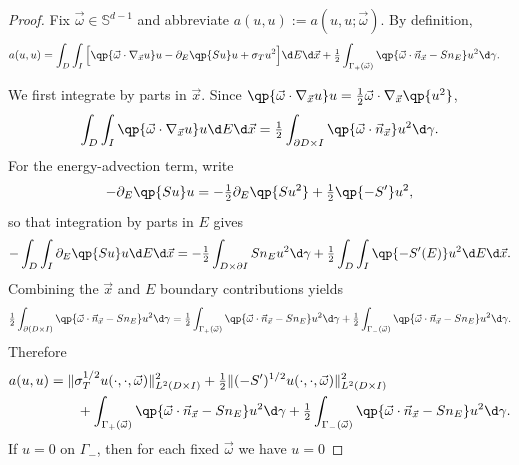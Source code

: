 \documentclass[final]{amsart}
\begin{document}
\begin{proof}
Fix $\vec{\omega}\in\mathbb{S}^{d-1}$ and abbreviate
$a(u,u):=a(u,u;\vec{\omega})$. By definition,
\begin{align*}
  a(u,u)
  &=
  \int_D \int_I
  \Big[\qp{\vec{\omega}\cdot\nabla_{\vec x} u} u
  - \partial_E\qp{S u} u
  + \sigma_T u^2\Big]\d E \d\vec{x}
  + \tfrac{1}{2}\int_{\Gamma_+(\vec\omega)}\qp{\vec{\omega}\cdot\vec{n}_{\vec x} - S n_E} u^2 \d\gamma.
\end{align*}

We first integrate by parts in $\vec{x}$. Since
$\qp{\vec{\omega}\cdot\nabla_{\vec x} u} u = \tfrac{1}{2}\vec{\omega}\cdot\nabla_{\vec x}\qp{u^2}$,
\begin{equation*}
  \int_D \int_I \qp{\vec{\omega}\cdot\nabla_{\vec x} u} u \d E \d\vec{x}
  =
  \tfrac{1}{2}\int_{\partial D\times I}\qp{\vec{\omega}\cdot\vec{n}_{\vec x}} u^2 \d\gamma.
\end{equation*}
For the energy-advection term, write
\begin{equation*}
  -\partial_E\qp{S u} u
  =
  -\tfrac{1}{2}\partial_E\qp{S u^2} + \tfrac{1}{2}\qp{-S'} u^2,
\end{equation*}
so that integration by parts in $E$ gives
\begin{equation*}
  -\int_D \int_I \partial_E\qp{S u} u \d E \d\vec{x}
  =
  -\tfrac{1}{2}\int_{D\times\partial I} S n_E u^2 \d\gamma
  + \tfrac{1}{2}\int_D \int_I \qp{-S'(E)} u^2 \d E \d\vec{x}.
\end{equation*}
Combining the $\vec{x}$ and $E$ boundary contributions yields
\begin{equation*}
  \tfrac{1}{2}\int_{\partial(D\times I)}
  \qp{\vec{\omega}\cdot\vec{n}_{\vec x} - S n_E} u^2 \d\gamma
  =
  \tfrac{1}{2}\int_{\Gamma_+(\vec\omega)}\qp{\vec{\omega}\cdot\vec{n}_{\vec x} - S n_E} u^2 \d\gamma
  + \tfrac{1}{2}\int_{\Gamma_-(\vec\omega)}\qp{\vec{\omega}\cdot\vec{n}_{\vec x} - S n_E} u^2 \d\gamma.
\end{equation*}
Therefore
\begin{align*}
  a(u,u)
  &=
  \|\sigma_T^{1/2}u(\cdot,\cdot,\vec\omega)\|_{L^2(D\times I)}^2
  + \tfrac{1}{2}\|(-S')^{1/2}u(\cdot,\cdot,\vec\omega)\|_{L^2(D\times I)}^2
  \\
  &\qquad + \int_{\Gamma_+(\vec\omega)}\qp{\vec{\omega}\cdot\vec{n}_{\vec x} - S n_E} u^2 \d\gamma
  + \tfrac{1}{2}\int_{\Gamma_-(\vec\omega)}\qp{\vec{\omega}\cdot\vec{n}_{\vec x} - S n_E} u^2 \d\gamma.
\end{align*}
If $u=0$ on $\Gamma_-$, then for each fixed $\vec\omega$ we have $u=0$

\end{proof}
\end{document}
